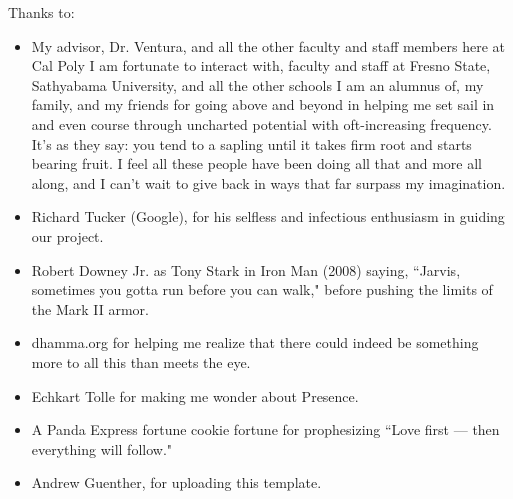 \noindent
Thanks to:
\begin{itemize}
    \item My advisor, Dr. Ventura, and all the other faculty and staff members here at Cal Poly I am fortunate to interact with, faculty and staff at Fresno State, Sathyabama University, and all the other schools I am an alumnus of, my family, and my friends for going above and beyond in helping me set sail in and even course through uncharted potential with oft-increasing frequency. It's as they say: you tend to a sapling until it takes firm root and starts bearing fruit. I feel all these people have been doing all that and more all along, and I can't wait to give back in ways that far surpass my imagination.
    \item Richard Tucker (Google), for his selfless and infectious enthusiasm in guiding our project.
    \item Robert Downey Jr. as Tony Stark in Iron Man (2008) saying, ``Jarvis, sometimes you gotta run before you can walk," before pushing the limits of the Mark II armor.
    \item dhamma.org for helping me realize that there could indeed be something more to all this than meets the eye.
    \item Echkart Tolle for making me wonder about Presence.
    \item A Panda Express fortune cookie fortune for prophesizing ``Love first --- then everything will follow."
    \item Andrew Guenther, for uploading this template.
\end{itemize}
